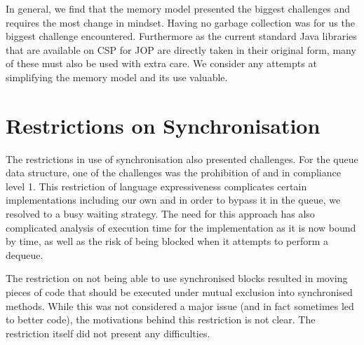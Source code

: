 In general, we find that the memory model presented the biggest challenges and requires the most change in mindset. Having no garbage collection was for us the biggest challenge encountered. Furthermore as the current standard Java libraries that are available on CSP for JOP are directly taken in their original form, many of these must also be used with extra care. We consider any attempts at simplifying the memory model and its use valuable.

 \section{Restrictions on Synchronisation} %
 \label{sec:restrictions_on_synchronisation}
The restrictions in use of synchronisation also presented challenges. For the queue data structure, one of the challenges was the prohibition of  and  in compliance level 1. This restriction of language expressiveness complicates certain implementations including our own and in order to bypass it in the queue, we resolved to a busy waiting strategy. The need for this approach has also complicated analysis of execution time for the implementation as it is now bound by time, as well as the risk of being blocked when it attempts to perform a dequeue.

The restriction on not being able to use synchronised blocks resulted in moving pieces of code that should be executed under mutual exclusion into synchronised methods. While this was not considered a major issue (and in fact sometimes led to better code), the motivations behind this restriction is not clear. The restriction itself did not present any difficulties.